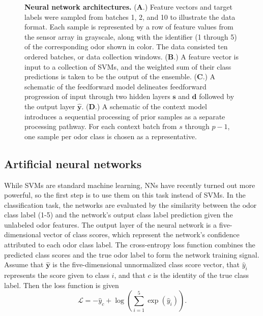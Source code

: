 \documentclass[onecolumn,pre,floats,aps,amsmath,amssymb,superscriptaddress]{revtex4-1}
\begin{document}
\begin{figure}
	\centering
	\caption{\textbf{Neural network architectures.} (\textbf{A}.) Feature vectors and target labels were sampled from batches 1, 2, and 10 to illustrate the data format. Each sample is represented by a row of feature values from the sensor array in grayscale, along with the identifier (1 through 5) of the corresponding odor shown in color. The data consisted ten ordered batches, or data collection windows. (\textbf{B}.) A feature vector is input to a collection of SVMs, and the weighted sum of their class predictions is taken to be the output of the ensemble. (\textbf{C}.) A schematic of the feedforward model delineates feedforward progression of input through two hidden layers $\mathbf{s}$ and $\mathbf{d}$ followed by the output layer $\hat{\mathbf{y}}$. (\textbf{D}.) A schematic of the context model introduces a sequential processing of prior samples as a separate processing pathway. For each context batch from $s$ through $p-1$, one sample per odor class is chosen as a representative.}
\end{figure}

\subsection{Artificial neural networks}

While SVMs are standard machine learning, NNs have recently turned out more powerful, so the first step is to use them on this task instead of SVMs. In the classification task, the networks are evaluated by the similarity between the odor class label (1-5) and the network's output class label prediction given the unlabeled odor features. The output layer of the neural network is a five-dimensional vector of class scores, which represent the network's confidence attributed to each odor class label. The cross-entropy loss function combines the predicted class scores and the true odor label to form the network training signal. Assume that $\hat{\mathbf{y}}$ is the five-dimensional unnormalized class score vector, that $\hat{y}_i$ represents the score given to class $i$, and that $c$ is the identity of the true class label. Then the loss function is given
\begin{equation}
\mathcal{L} = - \hat{y}_c + \log \left( \sum_{i=1}^5 \exp(\hat{y}_i) \right).
\end{equation}
\end{document}
